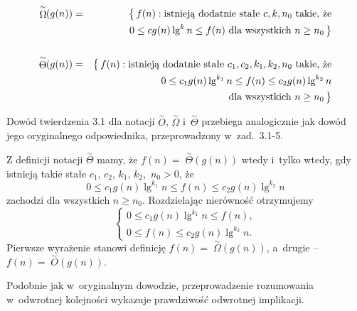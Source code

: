 
\subsubsection{} %
\begin{eqnarray*}
	\stackrel{\sim}{\Omega}\!\!(g(n)) &=& \bigl\{\,f(n):\hbox{istnieją dodatnie stałe }c,k,n_0\hbox{ takie, że} \\
	&& \quad 0 \le cg(n)\lg^kn \le f(n)\hbox{ dla wszystkich }n \ge n_0\,\bigr\} \\\\
	\stackrel{\sim}{\Theta}\!\!(g(n)) &=& \bigl\{\,f(n):\hbox{istnieją dodatnie stałe }c_1,c_2,k_1,k_2,n_0\hbox{ takie, że} \\
	&& \quad 0 \le c_1g(n)\lg^{k_1}n \le f(n) \le c_2g(n)\lg^{k_2}n \\
	&& \quad\hbox{dla wszystkich }n \ge n_0\,\bigr\}
\end{eqnarray*}

Dowód twierdzenia 3.1 dla notacji $\stackrel{\sim}{O}$, $\stackrel{\sim}{\Omega}$ i~$\stackrel{\sim}{\Theta}$ przebiega analogicznie jak dowód jego oryginalnego odpowiednika, przeprowadzony w~zad.~3.1-5.

Z definicji notacji $\stackrel{\sim}{\Theta}$ mamy, że $f(n)=\;\stackrel{\sim}{\Theta}\!\!(g(n))$ wtedy i~tylko wtedy, gdy istnieją takie stałe $c_1$, $c_2$, $k_1$, $k_2$,~$n_0>0$, że
\[
	0 \le c_1g(n)\lg^{k_1}n \le f(n) \le c_2g(n)\lg^{k_2}n
\]
zachodzi dla wszystkich $n\ge n_0$. Rozdzielając nierówność otrzymujemy
\[
	\begin{cases}
		0 \le c_1g(n)\lg^{k_1}n \le f(n), \\
		0 \le f(n) \le c_2g(n)\lg^{k_2}n.
	\end{cases}
\]
Pierwsze wyrażenie stanowi definicję $f(n)=\;\stackrel{\sim}{\Omega}\!\!(g(n))$, a~drugie -- $f(n)=\;\stackrel{\sim}{O}\!\!(g(n))$.

Podobnie jak w~oryginalnym dowodzie, przeprowadzenie rozumowania w~odwrotnej kolejności wykazuje prawdziwość odwrotnej implikacji.

\subsection{} %

